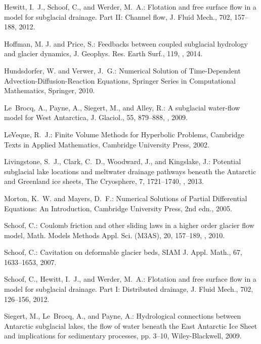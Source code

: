 \documentclass[11pt,reqno]{amsart}
\begin{document}
\begin{thebibliography}{}
Hewitt, I.~J., Schoof, C., and Werder, M.~A.: Flotation and free surface flow
  in a model for subglacial drainage. {P}art {II}: {C}hannel flow, J. Fluid
  Mech., 702, 157--188, 2012.

Hoffman, M. J. and Price, S.: Feedbacks between coupled subglacial hydrology and glacier dynamics, J. Geophys. Res. Earth Surf., 119, , 2014.

Hundsdorfer, W. and Verwer, J.~G.: Numerical {S}olution of {T}ime-{D}ependent
  {A}dvection-{D}iffusion-{R}eaction {E}quations, Springer Series in
  Computational Mathematics, Springer, 2010.

Le~Brocq, A., Payne, A., Siegert, M., and Alley, R.: A subglacial water-flow
  model for {W}est {A}ntarctica, J. Glaciol., 55, 879--888,
  , 2009.

LeVeque, R.~J.: Finite Volume Methods for Hyperbolic Problems, Cambridge Texts
  in Applied Mathematics, Cambridge University Press, 2002.

Livingstone, S.~J., Clark, C.~D., Woodward, J., and Kingslake, J.: Potential
  subglacial lake locations and meltwater drainage pathways beneath the
  {A}ntarctic and {G}reenland ice sheets, The Cryosphere, 7, 1721--1740,
  , 2013.

Morton, K.~W. and Mayers, D.~F.: Numerical {S}olutions of {P}artial
  {D}ifferential {E}quations: {A}n {I}ntroduction, Cambridge University Press,
  2nd edn., 2005.

Schoof, C.: Coulomb friction and other sliding laws in a higher order glacier
  flow model, Math. Models Methods Appl. Sci. (M3AS), 20, 157--189,
  , 2010{}.

Schoof, C.: Cavitation on deformable glacier beds, SIAM J. Appl. Math., 67,
  1633--1653, 2007.

Schoof, C., Hewitt, I.~J., and Werder, M.~A.: Flotation and free surface flow
  in a model for subglacial drainage. {P}art {I}: {D}istributed drainage, J.
  Fluid Mech., 702, 126--156, 2012.

Siegert, M., Le~Brocq, A., and Payne, A.: Hydrological connections between
  Antarctic subglacial lakes, the flow of water beneath the East Antarctic Ice
  Sheet and implications for sedimentary processes, pp. 3--10, Wiley-Blackwell,
  2009.


\end{thebibliography}
\end{document}
